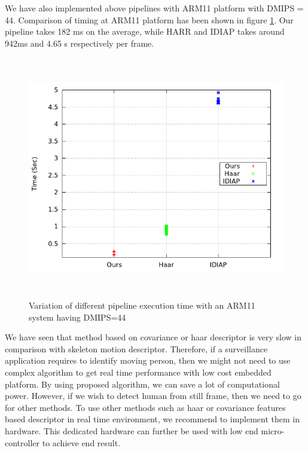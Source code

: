 \indent We have also implemented above pipelines with ARM11 platform
with DMIPS = 44.  Comparison of timing at ARM11 platform has been shown
in figure \ref{arm11_pipeline_execution_time}. Our pipeline takes 182 ms
on the average, while HARR and IDIAP takes around 942ms and 4.65 s
respectively per frame. 

\begin{figure}[!h]
\centering
\includegraphics[height=300pt]{Figures/arm11_pipeline_execution_time}
\caption{Variation of different pipeline execution time with an ARM11 system
having DMIPS=44}
\label{arm11_pipeline_execution_time}
\end{figure}

\indent We have seen that method based on covariance or haar descriptor
is very slow in comparison with skeleton motion descriptor. Therefore,
if a surveillance application requires to identify moving person, then
we might not need to use complex algorithm to get real time performance
with low cost embedded platform. By using proposed algorithm, we can
save a lot of computational power. However, if we wish to detect human
from still frame, then we need to go for other methods. To use other
methods such as haar or covariance features based descriptor in real
time environment, we recommend to implement them in hardware. This
dedicated hardware can further be used with low end micro-controller to
achieve end result.
